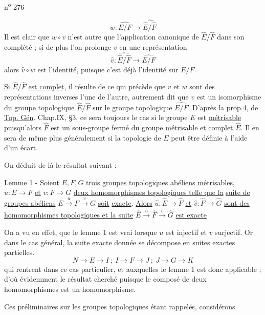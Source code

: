 n\textsuperscript{o} 276

\[
w:\widehat{E/F}\longrightarrow\widehat{\hat E/\hat F}
\]
Il est clair que $w\circ v$ n'est autre que l'application canonique de $\hat E/\hat F$ dans son complété ; si de plus l'on prolonge $v$ en une représentation
\[
\hat v:\widehat{\hat E/\hat F}\longrightarrow\widehat{E/F}
\]
alors $\hat v\circ w$ est l'identité, puisque c'est déjà l'identité sur $E/F$.

\uline{Si} $\hat E/\hat F$ \uline{est complet}, il résulte de ce qui précède que $v$ et $w$ sont des représentations inverses l'une de l'autre, autrement dit que $v$ est un isomorphisme du groupe topologique $\hat E/\hat F$ sur le groupe topologique $\widehat{E/F}$. D'après la prop.4, de \uline{Top. Gén}. Chap.IX, \S3, ce sera toujours le cas si le groupe $E$ est \uline{métrisable} puisqu'alors $\hat F$ est un sous-groupe fermé du groupe métrisable et complet $\hat E$. Il en sera de même plus généralement si la topologie de $E$ peut être définie à l'aide d'un écart.

On déduit de là le résultat suivant :

\uline{Lemme} 1 - \uline{Soient} $E,F,G$ \uline{trois groupes topologiques abéliens métrisables}, $u:E\longrightarrow F$ \uline{et} $v:F\longrightarrow G$ \uline{deux homomorphismes topologiques telle que la}
\uline{suite de groupes abéliens} $E\xrightarrow{u}F\xrightarrow{v}G$ \uline{soit} \uline{exacte}. \uline{Alors} $\hat u:\hat E\to\hat F$ \uline{et} $\hat v:\hat F\longrightarrow\hat G$ \uline{sont des homomorphismes topologiques et la suite} $\hat E\xrightarrow{\hat u}\hat F\xrightarrow{\hat v}\hat G$ \uline{est exacte}

On a vu en effet, que le lemme 1 est vrai lorsque $u$ est injectif et $v$ surjectif. Or dans le cas général, la suite exacte donnée se décompose en suites exactes partielles.
\[
N\longrightarrow E\longrightarrow I\ ;\ I\longrightarrow F\longrightarrow J\ ;\ J\longrightarrow G\longrightarrow K
\]
qui rentrent dans ce cas particulier, et auxquelles le lemme 1 est donc applicable ; d'où évidemment le résultat cherché puisque le composé de deux homomorphismes est un homomorphisme.

Ces préliminaires sur les groupes topologiques étant rappelés, considérons

